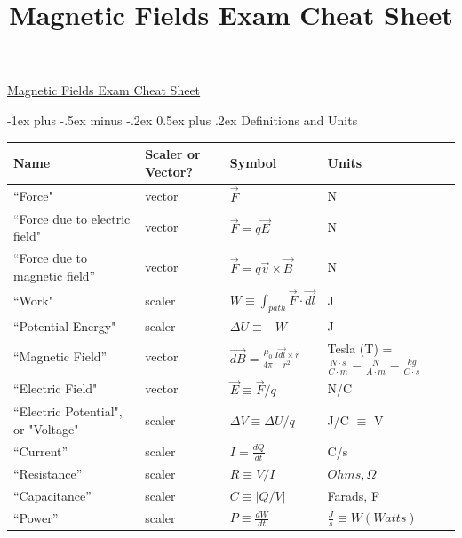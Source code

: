 \documentclass[10pt,landscape]{article}
\title{Magnetic Fields Exam Cheat Sheet}
\makeatletter
\renewcommand{\section}{\@startsection{section}{1}{0mm}%
                                {-1ex plus -.5ex minus -.2ex}%
                                {0.5ex plus .2ex}%
                                {\normalfont\large\bfseries}}
\makeatother
\begin{document}
\raggedright
\footnotesize
\begin{multicols}{3}


\setlength{\premulticols}{1pt}
\setlength{\postmulticols}{1pt}
\setlength{\multicolsep}{1pt}
\setlength{\columnsep}{2pt}

\begin{center}
     \Large{\underline{Magnetic Fields Exam Cheat Sheet}} \\
\end{center}

\section{Definitions and Units}
    \begin{tabular}{| L{1.7cm} | L{1.5cm} | L{2cm} | R{1cm} |}
    \hline
    Name & Scaler or Vector? & Symbol & Units \\ \hline
    ``Force" & vector & $\vec{F}$ & N \\ 
    ``Force due to electric field" & vector & $\vec{F} = q\vec{E}$ & N\\
    ``Force due to magnetic field'' & vector & $\vec{F} = q\vec{v}\times\vec{B}$ & N \\
    \hline
    ``Work" & scaler & $W \equiv \int_{path}\vec{F}\cdot\vec{dl}$ & J \\ \hline
    ``Potential Energy" & scaler & $\Delta U\equiv -W$ & J \\ \hline
    ``Magnetic Field'' & vector & $\vec{dB} = \frac{\mu_0}{4\pi}\frac{I\vec{dl}\times\hat{r}}{r^2}$ & Tesla (T) = $\frac{N\cdot s}{C\cdot m}=\frac{N}{A\cdot m}= \frac{kg}{C\cdot s}$ \\\hline
    ``Electric Field" & vector & $\vec{E}\equiv\vec{F}/q$ & N/C \\ \hline
    ``Electric Potential", or "Voltage" & scaler & $\Delta V\equiv\Delta U/q$ & J/C $\equiv$ V\\
    \hline
    ``Current'' & scaler & $I = \frac{dQ}{dt}$ & C/s \\\hline
    ``Resistance'' & scaler & $R\equiv V/I$ & $Ohms, \Omega$ \\ \hline
    ``Capacitance'' & scaler & $C \equiv |Q/V|$ & Farads, F \\\hline
    ``Power'' & scaler & $P \equiv \frac{dW}{dt}$ & $\frac{J}{s} \equiv W (Watts)$ \\ \hline
    \end{tabular}


\end{multicols}
\end{document}
